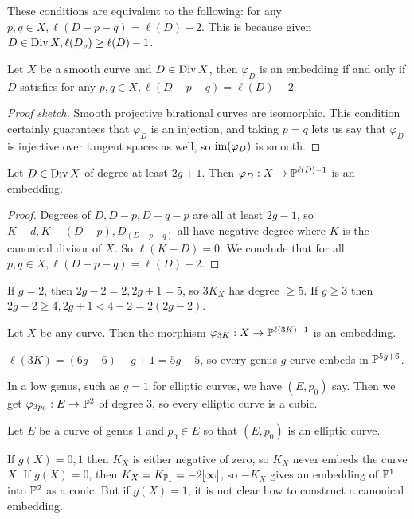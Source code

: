 \documentclass[10pt,a4paper,rgb]{article}
\begin{document}
These conditions are equivalent to the following: for any $p,q \in X, \ell(D-p-q) = \ell(D) - 2$. This is because given $D \in \Div X, \ell(D_p) \geq \ell(D)-1$.

\begin{theorem}
Let $X$ be a smooth curve and $D \in \Div X$, then $\varphi_D$ is an embedding if and only if $D$ satisfies for any $p,q \in X, \ell(D-p-q) = \ell(D) - 2$.
\end{theorem}
\begin{proof}[Proof sketch]
Smooth projective birational curves are isomorphic. This condition certainly guarantees that $\varphi_D$ is an injection, and taking $p=q$ lets us say that $\varphi_D$ is injective over tangent spaces as well, so $\Image(\varphi_D)$ is smooth.
\end{proof}
\begin{corollary}
Let $D \in \Div X$ of degree at least $2g+1$. Then $\varphi_D: X \to \P^{\ell(D)-1}$ is an embedding.
\end{corollary}
\begin{proof}
Degrees of $D, D-p,D-q-p$ are all at least $2g-1$, so $K-d, K-(D-p), D_(D-p-q)$ all have negative degree where $K$ is the canonical divisor of $X$. So $\ell(K-D) = 0$. We conclude that for all $p,q \in X, \ell(D-p-q) = \ell(D) - 2$.
\end{proof}
If $g = 2$, then $2g-2=2, 2g+1 = 5$, so $3K_X$ has degree $\geq 5$. If $g \geq 3$ then $2g-2 \geq 4, 2g+1 < 4-2 = 2(2g-2)$.
\begin{corollary}
Let $X$ be any curve. Then the morphism $\varphi_{3K}:X \to \P^{\ell(3K)-1}$ is an embedding.
\end{corollary}
$\ell(3K) = (6g-6)-g+1 = 5g-5$, so every genus $g$ curve embeds in $\P^{5g+6}$.

In a low genus, such as $g=1$ for elliptic curves, we have $(E, p_0)$ say. Then we get $\varphi_{3p_0}:E \to \P^2$ of degree 3, so every elliptic curve is a cubic.

Let $E$ be a curve of genus $1$ and $p_0 \in E$ so that $(E, p_0)$ is an elliptic curve.

If $g(X) = 0,1$ then $K_X$ is either negative of zero, so $K_X$ never embeds the curve $X$. If $g(X) = 0$, then $K_X = K_{\P_1} = -2[\infty]$, so $-K_X$ gives an embedding of $\P^1$ into $\P^2$ as a conic. But if $g(X) = 1$, it is not clear how to construct a canonical embedding.
\end{document}

